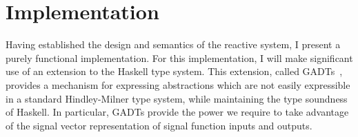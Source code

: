 \chapter{Implementation}
\label{chapter:Implementation}

Having established the design and semantics of the reactive system, I present a purely 
functional implementation. For this implementation, I will make significant use
of an extension to the Haskell type system. This extension, called
GADTs~\cite{Cheney2003,Xi2003}, provides a mechanism for expressing abstractions
which are not easily expressible in a standard Hindley-Milner type system, while
maintaining the type soundness of Haskell. In particular, GADTs provide the
power we require to take advantage of the signal vector representation of signal
function inputs and outputs.




